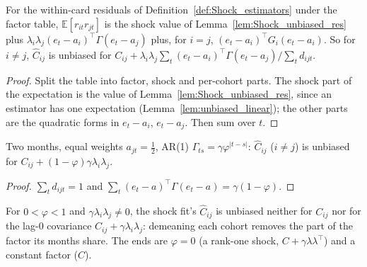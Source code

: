 \begin{theorem}\label{thm:Factor_shock_bias}
  \leanok
  For the within-card residuals of Definition~\ref{def:Shock_estimators} under the factor
  table, $\mathbb E[r_{it}r_{jt}]$ is the shock value of Lemma~\ref{lem:Shock_unbiased_res}
  plus $\lambda_i\lambda_j(e_t - a_i)^\top\Gamma(e_t - a_j)$ plus, for $i = j$,
  $(e_t - a_i)^\top G_i(e_t - a_i)$. So for $i \ne j$, $\hat C_{ij}$ is unbiased for
  $C_{ij} + \lambda_i\lambda_j\sum_t(e_t - a_i)^\top\Gamma(e_t - a_j)/\sum_t d_{ijt}$.
\end{theorem}
\begin{proof}
  \leanok
  Split the table into factor, shock and per-cohort parts. The shock part of the expectation
  is the value of Lemma~\ref{lem:Shock_unbiased_res}, since an estimator has one expectation
  (Lemma~\ref{lem:unbiased_linear}); the other parts are the quadratic forms in
  $e_t - a_i$, $e_t - a_j$. Then sum over $t$.
\end{proof}

\begin{theorem}\label{thm:Factor_crossHat_ar1}
  \leanok
  Two months, equal weights $a_{jt} = \tfrac12$, AR(1) $\Gamma_{ts} = \gamma\varphi^{|t-s|}$:
  $\hat C_{ij}$ ($i \ne j$) is unbiased for $C_{ij} + (1-\varphi)\gamma\lambda_i\lambda_j$.
\end{theorem}
\begin{proof}
  \leanok
  $\sum_t d_{ijt} = 1$ and $\sum_t (e_t - a)^\top\Gamma(e_t - a) = \gamma(1-\varphi)$.
\end{proof}

\begin{remark}[Finding 26]\label{rem:factor_shock_bias}
  For $0 < \varphi < 1$ and $\gamma\lambda_i\lambda_j \ne 0$, the shock fit's $\hat C_{ij}$ is
  unbiased neither for $C_{ij}$ nor for the lag-$0$ covariance $C_{ij} + \gamma\lambda_i\lambda_j$:
  demeaning each cohort removes the part of the factor its months share. The ends are
  $\varphi = 0$ (a rank-one shock, $C + \gamma\lambda\lambda^\top$) and a constant factor ($C$).
\end{remark}


